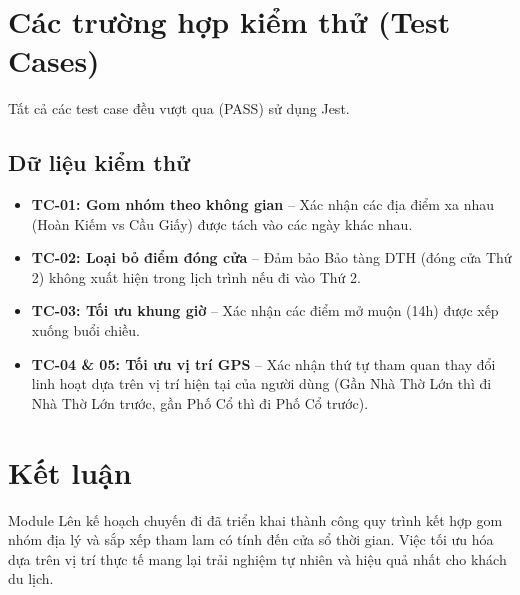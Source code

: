 \documentclass[12pt,a4paper]{report}
\begin{document}
\section{Các trường hợp kiểm thử (Test Cases)}

Tất cả các test case đều vượt qua (PASS) sử dụng Jest.

\subsection{Dữ liệu kiểm thử}

\begin{itemize}
    \item \textbf{TC-01: Gom nhóm theo không gian} -- Xác nhận các địa điểm xa nhau (Hoàn Kiếm vs Cầu Giấy) được tách vào các ngày khác nhau.
    \item \textbf{TC-02: Loại bỏ điểm đóng cửa} -- Đảm bảo Bảo tàng DTH (đóng cửa Thứ 2) không xuất hiện trong lịch trình nếu đi vào Thứ 2.
    \item \textbf{TC-03: Tối ưu khung giờ} -- Xác nhận các điểm mở muộn (14h) được xếp xuống buổi chiều.
    \item \textbf{TC-04 \& 05: Tối ưu vị trí GPS} -- Xác nhận thứ tự tham quan thay đổi linh hoạt dựa trên vị trí hiện tại của người dùng (Gần Nhà Thờ Lớn thì đi Nhà Thờ Lớn trước, gần Phố Cổ thì đi Phố Cổ trước).
\end{itemize}

\section{Kết luận}

Module Lên kế hoạch chuyến đi đã triển khai thành công quy trình kết hợp gom nhóm địa lý và sắp xếp tham lam có tính đến cửa sổ thời gian. Việc tối ưu hóa dựa trên vị trí thực tế mang lại trải nghiệm tự nhiên và hiệu quả nhất cho khách du lịch.
\end{document}
